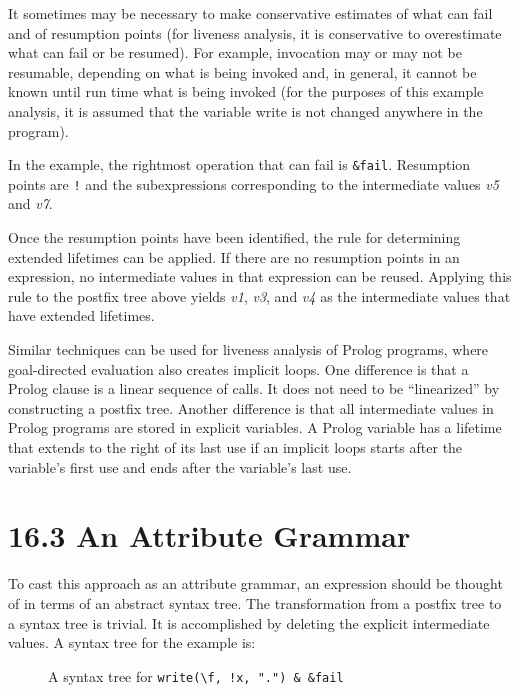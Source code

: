 It sometimes may be necessary to make conservative estimates of what
can fail and of resumption points (for liveness analysis, it is
conservative to overestimate what can fail or be resumed). For
example, invocation may or may not be resumable, depending on what is
being invoked and, in general, it cannot be known until run time what
is being invoked (for the purposes of this example analysis, it is
assumed that the variable write is not changed anywhere in the
program).

In the example, the rightmost operation that can fail is
\texttt{\&fail}. Resumption points are \texttt{!} and the
subexpressions corresponding to the intermediate values \textit{v5}
and \textit{v7}.

Once the resumption points have been identified, the rule for
determining extended lifetimes can be applied. If there are no
resumption points in an expression, no intermediate values in that
expression can be reused. Applying this rule to the postfix tree above
yields \textit{v1}, \textit{v3}, and \textit{v4} as the intermediate
values that have extended lifetimes.

Similar techniques can be used for liveness analysis of Prolog
programs, where goal-directed evaluation also creates implicit
loops. One difference is that a Prolog clause is a linear sequence of
calls. It does not need to be ``linearized'' by constructing a
postfix tree. Another difference is that all intermediate values in
Prolog programs are stored in explicit variables. A Prolog variable
has a lifetime that extends to the right of its last use if an
implicit loops starts after the variable's first use and ends after
the variable's last use.


\section[16.3 An Attribute Grammar]{16.3 An Attribute Grammar}

To cast this approach as an attribute grammar, an expression should be
thought of in terms of an abstract syntax tree.  The transformation
from a postfix tree to a syntax tree is trivial. It is accomplished by
deleting the explicit intermediate values. A syntax tree for the
example is:


\begin{figure}[htb]
\begin{center}
\end{center}
\caption{A syntax tree for \texttt{write({\textbackslash}f, !x, ".") \& \&fail}}
\end{figure}


